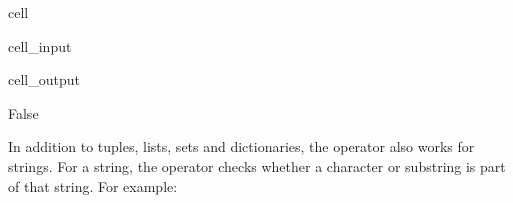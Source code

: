 \documentclass[letterpaper,10pt,english]{jupyterBook}
\begin{document}
\begin{sphinxuseclass}{cell}\begin{sphinxVerbatimInput}

\begin{sphinxuseclass}{cell_input}
\begin{sphinxVerbatim}[commandchars=\\\{\}]
       
   
\end{sphinxVerbatim}

\end{sphinxuseclass}\end{sphinxVerbatimInput}
\begin{sphinxVerbatimOutput}

\begin{sphinxuseclass}{cell_output}
\begin{sphinxVerbatim}[commandchars=\\\{\}]
False
\end{sphinxVerbatim}

\end{sphinxuseclass}\end{sphinxVerbatimOutput}

\end{sphinxuseclass}
\sphinxAtStartPar
In addition to tuples, lists, sets and dictionaries, the  operator also works for strings. For a string, the  operator checks whether a character or substring is part of that string. For example:
\end{document}

